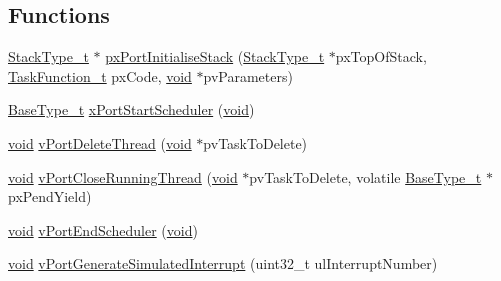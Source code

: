 \subsection*{Functions}
\begin{DoxyCompactItemize}
\item 
\hyperlink{Flsh186_2prtmacro_8h_a84e9a8ba132feed0b2401c1f4e2ac63c}{Stack\-Type\-\_\-t} $\ast$ \hyperlink{MSVC-MingW_2port_8c_a474fbbb58ea661a1557f05adc41120c1}{px\-Port\-Initialise\-Stack} (\hyperlink{Flsh186_2prtmacro_8h_a84e9a8ba132feed0b2401c1f4e2ac63c}{Stack\-Type\-\_\-t} $\ast$px\-Top\-Of\-Stack, \hyperlink{projdefs_8h_a24177544ba9c507a9429d6d5761eb487}{Task\-Function\-\_\-t} px\-Code, \hyperlink{Paradigm_2Tern__EE_2small_2portmacro_8h_a14d32f8130d3c0b212cfc751730b5b49}{void} $\ast$pv\-Parameters)
\item 
\hyperlink{Flsh186_2prtmacro_8h_ac826f39420fcf5b32ba7123a1d243f99}{Base\-Type\-\_\-t} \hyperlink{MSVC-MingW_2port_8c_ade5a8c6666e7413a0355cc252029c5c6}{x\-Port\-Start\-Scheduler} (\hyperlink{Paradigm_2Tern__EE_2small_2portmacro_8h_a14d32f8130d3c0b212cfc751730b5b49}{void})
\item 
\hyperlink{Paradigm_2Tern__EE_2small_2portmacro_8h_a14d32f8130d3c0b212cfc751730b5b49}{void} \hyperlink{MSVC-MingW_2port_8c_acf1c499e470a756717e0ba8203260a32}{v\-Port\-Delete\-Thread} (\hyperlink{Paradigm_2Tern__EE_2small_2portmacro_8h_a14d32f8130d3c0b212cfc751730b5b49}{void} $\ast$pv\-Task\-To\-Delete)
\item 
\hyperlink{Paradigm_2Tern__EE_2small_2portmacro_8h_a14d32f8130d3c0b212cfc751730b5b49}{void} \hyperlink{MSVC-MingW_2port_8c_ad3564ae551c470eeb87262ed6c2f3cee}{v\-Port\-Close\-Running\-Thread} (\hyperlink{Paradigm_2Tern__EE_2small_2portmacro_8h_a14d32f8130d3c0b212cfc751730b5b49}{void} $\ast$pv\-Task\-To\-Delete, volatile \hyperlink{Flsh186_2prtmacro_8h_ac826f39420fcf5b32ba7123a1d243f99}{Base\-Type\-\_\-t} $\ast$px\-Pend\-Yield)
\item 
\hyperlink{Paradigm_2Tern__EE_2small_2portmacro_8h_a14d32f8130d3c0b212cfc751730b5b49}{void} \hyperlink{MSVC-MingW_2port_8c_af76f3c0b44c5b5c06fc046a4ee1a6423}{v\-Port\-End\-Scheduler} (\hyperlink{Paradigm_2Tern__EE_2small_2portmacro_8h_a14d32f8130d3c0b212cfc751730b5b49}{void})
\item 
\hyperlink{Paradigm_2Tern__EE_2small_2portmacro_8h_a14d32f8130d3c0b212cfc751730b5b49}{void} \hyperlink{MSVC-MingW_2port_8c_a42248a1986691ed4d9344fd75789d69c}{v\-Port\-Generate\-Simulated\-Interrupt} (uint32\-\_\-t ul\-Interrupt\-Number)
\item 

\end{DoxyCompactItemize}
